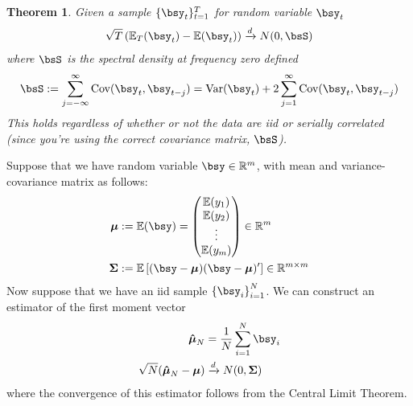 \documentclass[12pt]{article}
\theoremstyle{plain}
\newtheorem{thm}{Theorem}[section]
\theoremstyle{definition}
\theoremstyle{remark}
\newcommand{\bsmu}{\boldsymbol{\mu}}
\newcommand{\bsSigma}{\boldsymbol{\Sigma}}
\newcommand{\bshatmu}{\boldsymbol{\hat{\mu}}}
\newcommand{\dto}{\xrightarrow{d}}
\begin{document}
\begin{thm}
Given a sample $\{\bsy_t\}_{t=1}^T$ for random variable
$\bsy_t$
\begin{align*}
  \sqrt{T}\left(
    \mathbb{E}_T(\bsy_t) -\mathbb{E}(\bsy_t)
  \right)
  \xrightarrow{d} N(0,\bsS)
\end{align*}
where $\bsS$ is the spectral density at frequency zero defined
\begin{align*}
  \bsS :=
  \sum^\infty_{j=-\infty}
    \text{\normalfont Cov}(\bsy_t, \bsy_{t-j})
  =
  \text{\normalfont Var}(\bsy_t)
  + 2 \sum^\infty_{j=1}
  \text{\normalfont Cov}(\bsy_t,\bsy_{t-j})
\end{align*}
This holds regardless of whether or not the data are iid or serially
correlated (since you're using the correct covariance matrix,
$\bsS$).
\end{thm}

Suppose that we have random variable
$\bsy\in \mathbb{R}^m$, with mean and variance-covariance matrix as
follows:
\begin{align*}
  \bsmu &:= \mathbb{E}(\bsy) =
  \begin{pmatrix}
    \mathbb{E}(y_1)\\\mathbb{E}(y_2)\\\vdots\\\mathbb{E}(y_m)
  \end{pmatrix}
  \in \mathbb{R}^m
  \\
  \bsSigma
  &:=
  \mathbb{E}\left[ (\bsy-\bsmu) (\bsy-\bsmu)' \right]
  \in \mathbb{R}^{m\times m}
\end{align*}
Now suppose that we have an iid sample $\left\{\bsy_i\right\}_{i=1}^N$.
We can construct an estimator of the first moment vector
\begin{align*}
  \bshatmu_N
  &=
  \frac{1}{N}
  \sum^N_{i=1}
  \bsy_i\\
  \sqrt{N}(\bshatmu_N - \bsmu)
  &\dto N(0,\bsSigma)
\end{align*}
where the convergence of this estimator follows from the Central Limit
Theorem.
\end{document}

